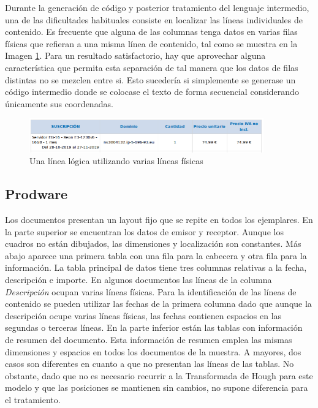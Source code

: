 Durante la generación de código y posterior tratamiento del lenguaje intermedio, una de las dificultades habituales consiste en localizar las líneas individuales de contenido. Es frecuente que alguna de las columnas tenga datos en varias filas físicas que refieran a una misma línea de contenido, tal como se muestra en la Imagen \ref{fig:una-linea-lógica-varias-fisicas}. Para un resultado satisfactorio, hay que aprovechar alguna característica que permita esta separación de tal manera que los datos de filas distintas no se mezclen entre si. Esto sucedería si simplemente se generase un código intermedio donde se colocase el texto de forma secuencial considerando únicamente sus coordenadas.

\begin{figure}[hp!]
    \centering
    \includegraphics[width=0.9\textwidth]{imaxes/g-analisis/varias-lineas-en-una.png}
    \caption{Una línea lógica utilizando varias líneas físicas}
    \label{fig:una-linea-lógica-varias-fisicas}
\end{figure}

\subsection{Prodware}

Los documentos presentan un layout fijo que se repite en todos los ejemplares. En la parte superior se encuentran los datos de emisor y receptor. Aunque los cuadros no están dibujados, las dimensiones y localización son constantes. Más abajo aparece una primera tabla con una fila para la cabecera y otra fila para la información. La tabla principal de datos tiene tres columnas relativas a la fecha, descripción e importe. En algunos documentos las líneas de la columna \emph{Descripción} ocupan varias líneas físicas. Para la identificación de las líneas de contenido se pueden utilizar las fechas de la primera columna dado que aunque la descripción ocupe varias líneas físicas, las fechas contienen espacios en las segundas o terceras líneas. En la parte inferior están las tablas con información de resumen del documento. Esta información de resumen emplea las mismas dimensiones y espacios en todos los documentos de la muestra. A mayores, dos casos son diferentes en cuanto a que no presentan las líneas de las tablas. No obstante, dado que no es necesario recurrir a la Transformada de Hough para este modelo y que las posiciones se mantienen sin cambios, no supone diferencia para el tratamiento.
 
